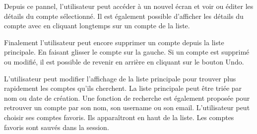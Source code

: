 
Depuis ce pannel, l'utilisateur peut accéder à un nouvel écran et voir ou éditer les détails du compte sélectionné. Il est également possible d'afficher les détails du compte avec en cliquant longtemps sur un compte de la liste.


Finalement l'utilisateur peut encore supprimer un compte depuis la liste principale. En faisant glisser le compte sur la gauche. Si un compte est supprimé ou modifié, il est possible de revenir en arrière en cliquant sur le bouton Undo.


L'utilisateur peut modifier l'affichage de la liste principale pour trouver plus rapidement les comptes qu'ils cherchent. La liste principale peut être triée par nom ou date de création. Une fonction de recherche est également proposée pour retrouver un compte par son nom, son username ou son email. L'utilisateur peut choisir ses comptes favoris. Ils apparaîtront en haut de la liste. Les comptes favoris sont sauvés dans la session.


